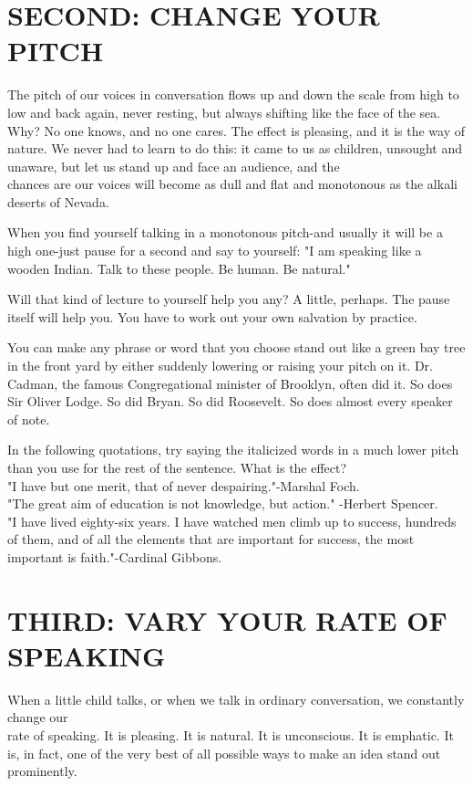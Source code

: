 \documentclass[10pt]{article}
\begin{document}
\section*{SECOND: CHANGE YOUR PITCH}
The pitch of our voices in conversation flows up and down the scale from high to low and back again, never resting, but always shifting like the face of the sea. Why? No one knows, and no one cares. The effect is pleasing, and it is the way of nature. We never had to learn to do this: it came to us as children, unsought and unaware, but let us stand up and face an audience, and the\\
chances are our voices will become as dull and flat and monotonous as the alkali deserts of Nevada.

When you find yourself talking in a monotonous pitch-and usually it will be a high one-just pause for a second and say to yourself: "I am speaking like a wooden Indian. Talk to these people. Be human. Be natural."

Will that kind of lecture to yourself help you any? A little, perhaps. The pause itself will help you. You have to work out your own salvation by practice.

You can make any phrase or word that you choose stand out like a green bay tree in the front yard by either suddenly lowering or raising your pitch on it. Dr. Cadman, the famous Congregational minister of Brooklyn, often did it. So does Sir Oliver Lodge. So did Bryan. So did Roosevelt. So does almost every speaker of note.

In the following quotations, try saying the italicized words in a much lower pitch than you use for the rest of the sentence. What is the effect?\\
"I have but one merit, that of never despairing."-Marshal Foch.\\
"The great aim of education is not knowledge, but action." -Herbert Spencer.\\
"I have lived eighty-six years. I have watched men climb up to success, hundreds of them, and of all the elements that are important for success, the most important is faith."-Cardinal Gibbons.

\section*{THIRD: VARY YOUR RATE OF SPEAKING}
When a little child talks, or when we talk in ordinary conversation, we constantly change our\\
rate of speaking. It is pleasing. It is natural. It is unconscious. It is emphatic. It is, in fact, one of the very best of all possible ways to make an idea stand out prominently.
\end{document}
